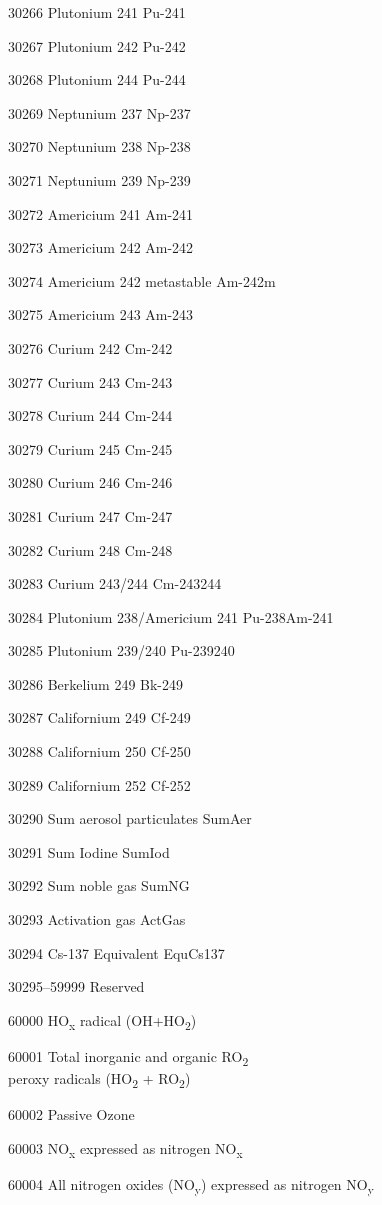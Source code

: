 30266 Plutonium 241 Pu-241

30267 Plutonium 242 Pu-242

30268 Plutonium 244 Pu-244

30269 Neptunium 237 Np-237

30270 Neptunium 238 Np-238

30271 Neptunium 239 Np-239

30272 Americium 241 Am-241

30273 Americium 242 Am-242

30274 Americium 242 metastable Am-242m

30275 Americium 243 Am-243

30276 Curium 242 Cm-242

30277 Curium 243 Cm-243

30278 Curium 244 Cm-244

30279 Curium 245 Cm-245

30280 Curium 246 Cm-246

30281 Curium 247 Cm-247

30282 Curium 248 Cm-248

30283 Curium 243/244 Cm-243244

30284 Plutonium 238/Americium 241 Pu-238Am-241

30285 Plutonium 239/240 Pu-239240

30286 Berkelium 249 Bk-249

30287 Californium 249 Cf-249

30288 Californium 250 Cf-250

30289 Californium 252 Cf-252

30290 Sum aerosol particulates SumAer

30291 Sum Iodine SumIod

30292 Sum noble gas SumNG

30293 Activation gas ActGas

30294 Cs-137 Equivalent EquCs137

30295--59999 Reserved

60000 HO\textsubscript{x} radical (OH+HO\textsubscript{2})

60001 Total inorganic and organic RO\textsubscript{2}\\
peroxy radicals (HO\textsubscript{2} + RO\textsubscript{2})

60002 Passive Ozone

60003 NO\textsubscript{x} expressed as nitrogen NO\textsubscript{x}

60004 All nitrogen oxides (NO\textsubscript{y}) expressed as nitrogen NO\textsubscript{y}

